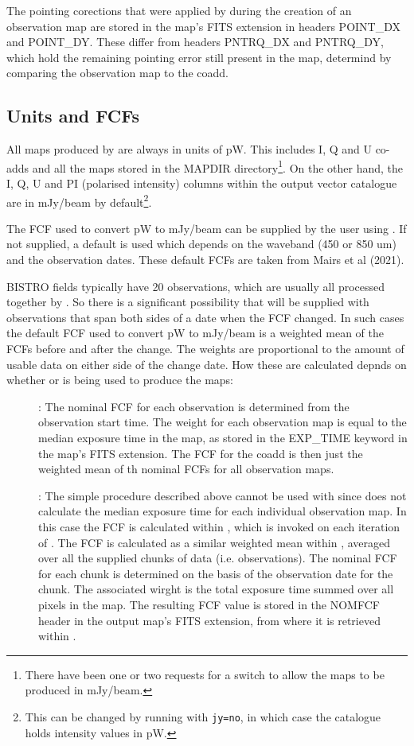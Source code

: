 \documentclass[twoside,11pt]{starlink}
\begin{document}
The pointing corections that were applied by \mmap during the creation of
an observation map are stored in the map's FITS extension in headers
POINT\_DX and POINT\_DY. These differ from headers PNTRQ\_DX and
PNTRQ\_DY, which hold the remaining pointing error still present in the
map, determind by comparing the observation map to the coadd.

\subsection{Units and FCFs}
All maps produced by \ptmap are always in units of pW. This includes I, Q
and U co-adds and all the maps stored in the MAPDIR
directory\footnote{There have been one or two requests for a switch to
allow the maps to be produced in mJy/beam.}. On the
other hand, the I, Q, U and PI (polarised intensity) columns within the
output vector catalogue are in mJy/beam by default\footnote{This can be changed
by running \ptmap with \texttt{jy=no}, in which case the catalogue holds
intensity values in pW.}.

The FCF used to convert pW to mJy/beam can be supplied by the user using
. If not supplied, a default is used which depends on the
waveband (450 or 850 um) and the observation dates. These default FCFs
are taken from Mairs et al (2021).

BISTRO fields typically have 20 observations, which are usually all processed
together by \ptmap. So there is a significant possibility that \ptmap
will be supplied with observations that span both sides of a date when
the FCF changed. In such cases the default FCF used to convert pW to
mJy/beam is a weighted mean of the FCFs before and after the change. The
weights are proportional to the amount of usable data on either side of the
change date. How these are calculated depnds on whether \mmap or \sloop
is being used to produce the maps:

\begin{description}
\item[\mmap]:
The nominal FCF for each observation is determined from the observation
start time. The weight for each observation map is equal to the median
exposure time in the map, as stored in the EXP\_TIME keyword in the map's
FITS extension. The FCF for the coadd is then just the weighted mean of
th nominal FCFs for all observation maps.

\item[\sloop]: The simple procedure described above cannot be used with
\sloop since \sloop does not calculate the median exposure time for each
individual observation map. In this case the FCF is calculated within
\mmap, which is invoked on each iteration of \sloop. The FCF is
calculated as a similar weighted mean within \mmap, averaged over all the
supplied chunks of data (i.e. observations). The nominal FCF for each
chunk is determined on the basis of the observation date for the chunk.
The associated wirght is the total exposure time summed over all pixels
in the map. The resulting FCF value is stored in the NOMFCF header in the
output map's FITS extension, from where it is retrieved within \ptmap.
\end{description}
\end{document}
